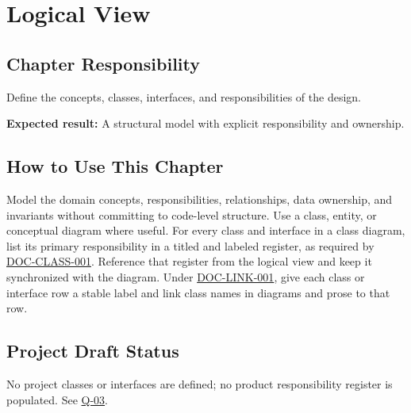 \chapter{Logical View}
\section{Chapter Responsibility}
\label{Section:LogicalViewResponsibility}
Define the concepts, classes, interfaces, and responsibilities of the design.

\noindent\textbf{Expected result:} A structural model with explicit responsibility and ownership.

\section{How to Use This Chapter}
Model the domain concepts, responsibilities, relationships, data ownership, and invariants without committing to code-level structure. Use a class, entity, or conceptual diagram where useful. For every class and interface in a class diagram, list its primary responsibility in a titled and labeled register, as required by \hyperref[Requirement:DOCCLASS001]{DOC-CLASS-001}. Reference that register from the logical view and keep it synchronized with the diagram. Under \hyperref[Requirement:DOCLINK001]{DOC-LINK-001}, give each class or interface row a stable label and link class names in diagrams and prose to that row.
\section{Project Draft Status}
No project classes or interfaces are defined; no product responsibility register is populated. See \hyperref[Question:Q-03]{Q-03}.
